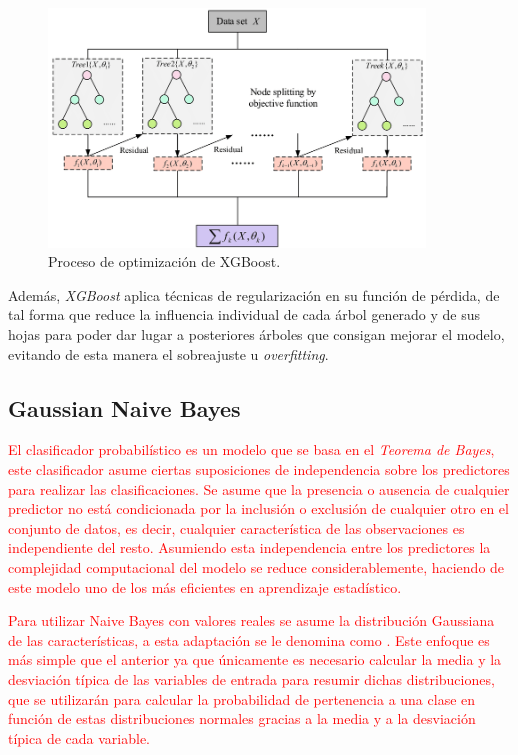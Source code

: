             \begin{figure}[h]
                \centering
                \includegraphics[width=10cm]{archivos/3.Tecnologias/XGBoost/XGBoostFlowImage}
                \caption{Proceso de optimización de XGBoost.}
                \label{XGBoostFlowImage}
             \end{figure}

            
            Además, \textit{XGBoost} aplica técnicas de regularización en su función de pérdida, de tal forma que reduce la influencia individual de cada árbol generado y de sus hojas para poder dar lugar a posteriores árboles que consigan mejorar el modelo, evitando de esta manera el sobreajuste u \textit{overfitting}.


        \subsection {Gaussian Naive Bayes}

        \textcolor{red}{El clasificador probabilístico  es un modelo que se basa en el \textit{Teorema de Bayes}, este clasificador asume ciertas suposiciones de independencia sobre los predictores para realizar las clasificaciones. Se asume que la presencia o ausencia de cualquier predictor no está condicionada por la inclusión o exclusión de cualquier otro en el conjunto de datos, es decir, cualquier característica de las observaciones es independiente del resto. Asumiendo esta independencia entre los predictores la complejidad computacional del modelo se reduce considerablemente, haciendo de este modelo uno de los más eficientes en aprendizaje estadístico.}

        \textcolor{red}{Para utilizar Naive Bayes con valores reales se asume la distribución Gaussiana de las características, a esta adaptación se le denomina como . Este enfoque es más simple que el anterior ya que únicamente es necesario calcular la media y la desviación típica de las variables de entrada para resumir dichas distribuciones, que se utilizarán para calcular la probabilidad de pertenencia a una clase en función de estas distribuciones normales gracias a la media y a la desviación típica de cada variable.}

